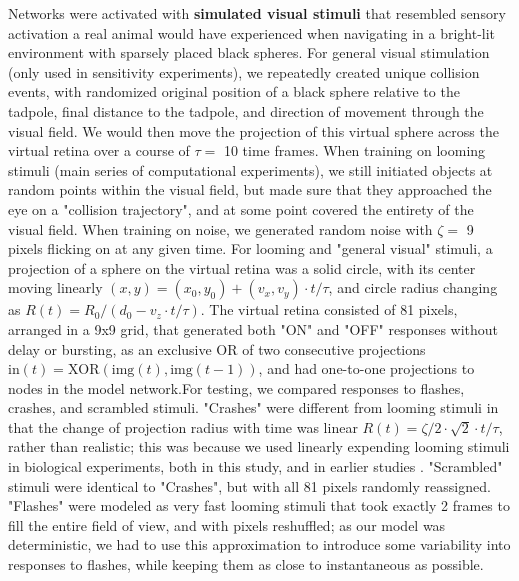 \documentclass{article}
\begin{document}
Networks were activated with \textbf{simulated visual stimuli} that resembled sensory activation a real animal would have experienced when navigating in a bright-lit environment with sparsely placed black spheres. For general visual stimulation (only used in sensitivity experiments), we repeatedly created unique collision events, with randomized original position of a black sphere relative to the tadpole, final distance to the tadpole, and direction of movement through the visual field. We would then move the projection of this virtual sphere across the virtual retina over a course of $\tau=$ 10 time frames.  When training on looming stimuli (main series of computational experiments), we still initiated objects at random points within the visual field, but made sure that they approached the eye on a "collision trajectory", and at some point covered the entirety of the visual field. When training on noise, we generated random noise with $\zeta=$ 9 pixels flicking on at any given time. For looming and "general visual" stimuli, a projection of a sphere on the virtual retina was a solid circle, with its center moving linearly $(x,y) = (x_0,y_0)+(v_x,v_y)\cdot t/\tau$, and circle radius changing as $R(t) = R_0/(d_0 - v_z \cdot t/\tau)$. The virtual retina consisted of 81 pixels, arranged in a 9x9 grid, that generated both "ON" and "OFF" responses without delay or bursting, as an exclusive OR of two consecutive projections $\text{in}(t) = \text{XOR}(\text{img}(t),\text{img}(t-1))$, and had one-to-one projections to nodes in the model network.For testing, we compared responses to flashes, crashes, and scrambled stimuli. "Crashes" were different from looming stimuli in that the change of projection radius with time was linear $R(t) = \zeta/2 \cdot \sqrt{2} \cdot t/\tau$, rather than realistic; this was because we used linearly expending looming stimuli in biological experiments, both in this study, and in earlier studies \citep{khakhalin2014}. "Scrambled" stimuli were identical to "Crashes", but with all 81 pixels randomly reassigned. "Flashes" were modeled as very fast looming stimuli that took exactly 2 frames to fill the entire field of view, and with pixels reshuffled; as our model was deterministic, we had to use this approximation to introduce some variability into responses to flashes, while keeping them as close to instantaneous as possible.
\end{document}
